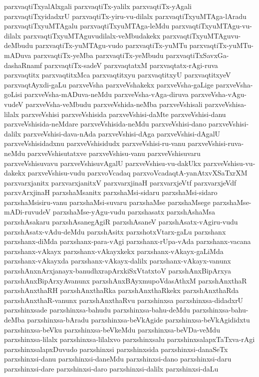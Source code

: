 {parxvaqtiTxyalAlxgali
parxvaqtiTx-yalilx
parxvaqtiTx-yAgali
parxvaqtiTxyidadxrU
parxvaqtiTx-yiru-vu-dilalx
parxvaqtiTxyuMTAga-lAradu
parxvaqtiTxyuMTAgalu
parxvaqtiTxyuMTAga-leMdu
parxvaqtiTxyuMTAgu-vu-dilalx
parxvaqtiTxyuMTAguvudilalx-veMbudakekx
parxvaqtiTxyuMTAguvu-deMbudu
parxvaqtiTx-yuMTAgu-vudo
parxvaqtiTx-yuMTu
parxvaqtiTx-yuMTu-mADuva
parxvaqtiTx-yeMba
parxvaqtiTx-yeMbudu
parxvaqtiTxSavxGa-dashaRnamf
parxvaqtiTx-sadeV
parxvaqtatxM
parxvaqtatx-rAgi-ruva
parxvaqtitx
parxvaqtitxMca
parxvaqtitxyu
parxvaqtitxyU
parxvaqtitxyeV
parxvaqtAyxdi-gaLu
parxveVsha
parxveVshakekx
parxveVsha-gaLige
parxveVsha-goLisi
parxveVsha-mADuva-neMdu
parxveVsha-vAga-diruva
parxveVsha-vAgu-vudeV
parxveVsha-veMbudu
parxveVshida-neMba
parxveVshisali
parxveVshisa-lilalx
parxveVshisi
parxveVshisida
parxveVshisi-daMte
parxveVshisi-danu
parxveVshisida-neMdare
parxveVshisida-neMdu
parxveVshisi-dano
parxveVshisi-dalilx
parxveVshisi-dava-nAda
parxveVshisi-dAga
parxveVshisi-dAgalU
parxveVshisidadxnu
parxveVshisidudx
parxveVshisi-ru-vanu
parxveVshisi-ruva-neMdu
parxveVshisutatxve
parxveVshisu-vanu
parxveVshisuvaru
parxveVshisuvavu
parxveVshisuvAgalU
parxveVshisu-vu-dakUkx
parxveVshisu-vu-dakekx
parxveVshisu-vudu
parxvoVcadaq
parxvoVcadaqtA-yanAtxvXSaTxrXM
parxvarxjanitx
parxvarxjanitxV
parxvarxjinaH
parxvarxjeVtf
parxvarxjeVdf
parxvArxjinaH
parxshaMsanitx
parxshaMsi-sidaru
parxshaMsi-sidaro
parxshaMsisiru-vanu
parxshaMsi-suvaru
parxshaMse
parxshaMsege
parxshaMse-mADi-ruvudeV
parxshaMse-yAgu-vudu
parxshasatx
parxshAshaMsa
parxshAsakaru
parxshAsanegAgiR
parxshAsaneV
parxshAsatx-vAgiru-vudu
parxshAsatx-vAdu-deMdu
parxshAsitx
parxshotxVtarx-gaLu
parxshanx
parxshanx-diMda
parxshanx-para-vAgi
parxshanx-rUpa-vAda
parxshanx-vacana
parxshanx-vAkayx
parxshanx-vAkayxkekx
parxshanx-vAkayx-gaLiMda
parxshanx-vAkayxda
parxshanx-vAkayx-dalilx
parxshanx-vAkayx-vanunx
parxshAnxnArxjanayx-banudhxrapArxkiSxVtatxtoV
parxshAnxBipArxya
parxshAnxBipArxyAvanunx
parxshAnxBAyxmupoVdasAthxM
parxshAnxthaR
parxshAnxthaRH
parxshAnxthaRka
parxshAnxthaRkekx
parxshAnxthaRda
parxshAnxthaR-vanunx
parxshAnxthaRvu
parxshinxsa
parxshinxsa-didadxrU
parxshinxsade
parxshinxsa-bahudu
parxshinxsa-bahu-deMdu
parxshinxsa-bahu-deMba
parxshinxsa-bAradu
parxshinxsa-beVkAgide
parxshinxsa-beVkAgididxtu
parxshinxsa-beVku
parxshinxsa-beVkeMdu
parxshinxsa-beVDa-veMdu
parxshinxsa-lilalx
parxshinxsa-lilalxvo
parxshinxsalu
parxshinxsalapxTaTxva-rAgi
parxshinxsalapxDuvudo
parxshinxsi
parxshinxsida
parxshinxsi-danaSeTx
parxshinxsi-danu
parxshinxsi-daneMdu
parxshinxsi-dano
parxshinxsi-daru
parxshinxsi-dare
parxshinxsi-daro
parxshinxsi-dalilx
parxshinxsi-daLu
}
